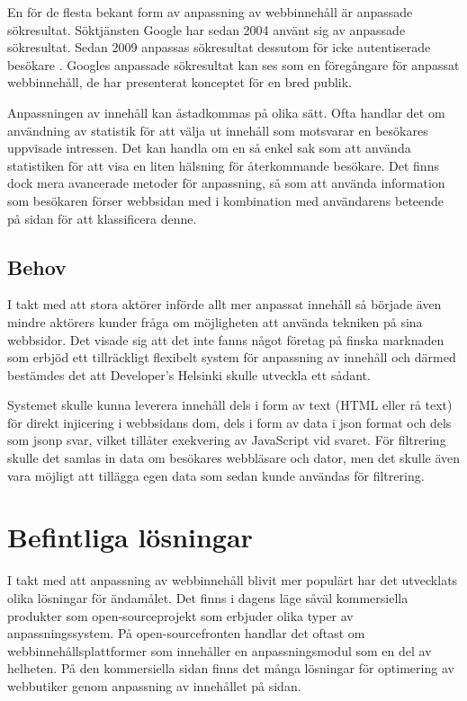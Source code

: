 En för de flesta bekant form av anpassning av webbinnehåll är anpassade sökresultat. Söktjänsten Google har sedan 2004 använt sig av anpassade sökresultat. Sedan 2009 anpassas sökresultat dessutom för icke autentiserade besökare \citep{Hannak:2013:MPW:2488388.2488435}. Googles anpassade sökresultat kan ses som en föregångare för anpassat webbinnehåll, de har presenterat konceptet för en bred publik.

Anpassningen av innehåll kan åstadkommas på olika sätt. Ofta handlar det om användning av statistik för att välja ut innehåll som motsvarar en besökares uppvisade intressen. Det kan handla om en så enkel sak som att använda statistiken för att visa en liten hälsning för återkommande besökare. Det finns dock mera avancerade metoder för anpassning, så som att använda information som besökaren förser webbsidan med i kombination med användarens beteende på sidan för att klassificera denne. \citep{Albanese:2004:WPB:1031453.1031469} 

\subsection{Behov}

I takt med att stora aktörer införde allt mer anpassat innehåll så började även mindre aktörers kunder fråga om möjligheten att använda tekniken på sina webbsidor. Det visade sig att det inte fanns något företag på finska marknaden som erbjöd ett tillräckligt flexibelt system för anpassning av innehåll och därmed bestämdes det att Developer's Helsinki skulle utveckla ett sådant.

Systemet skulle kunna leverera innehåll dels i form av text (HTML eller rå text) för direkt injicering i webbsidans \gls{dom}, dels i form av data i \gls{json} format och dels som \gls{jsonp} svar, vilket tillåter exekvering av JavaScript vid svaret. För filtrering skulle det samlas in data om besökares webbläsare och dator, men det skulle även vara möjligt att tillägga egen data som sedan kunde användas för filtrering.

\section{Befintliga lösningar}

I takt med att anpassning av webbinnehåll blivit mer populärt har det utvecklats olika lösningar för ändamålet. Det finns i dagens läge såväl kommersiella produkter som open-sourceprojekt som erbjuder olika typer av anpassningssystem. På open-sourcefronten handlar det oftast om webbinnehållsplattformer som innehåller en anpassningsmodul som en del av helheten. På den kommersiella sidan finns det många lösningar för optimering av webbutiker genom anpassning av innehållet på sidan.

